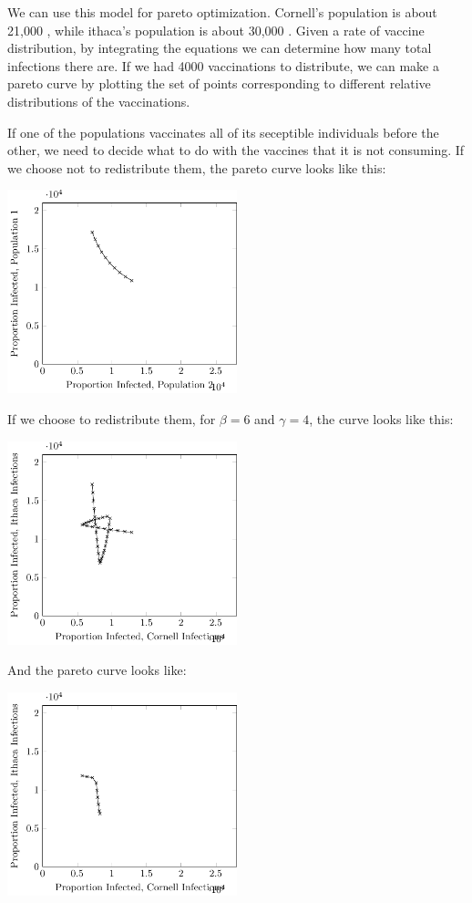 \documentclass{article}
\begin{document}
We can use this model for pareto optimization.
Cornell's population is about 21,000 \cite{cornellpop},
	while ithaca's population is about 30,000 \cite{census}.
Given a rate of vaccine distribution, by integrating the equations
	we can determine how many total infections there are.
If we had 4000 vaccinations to distribute, we can make a pareto
	curve by plotting the set of points corresponding to different
	relative distributions of the vaccinations.

If one of the populations vaccinates all of its seceptible individuals
	before the other, we need to decide what to do with the vaccines
	that it is not consuming.
If we choose not to redistribute them, the pareto curve looks like this:

\includegraphics[width=0.5\textwidth]{figures/sir-pareto.pdf}

If we choose to redistribute them, for $\beta = 6$ and $\gamma = 4$,
	the curve looks like this:

\includegraphics[width=0.5\textwidth]{figures/sir-pareto-top.pdf}

And the pareto curve looks like:

\includegraphics[width=0.5\textwidth]{figures/sir-pareto-top-pareto.pdf}
\end{document}
